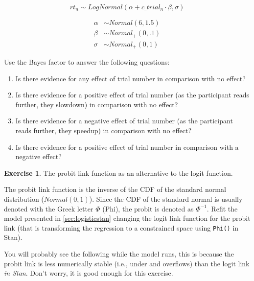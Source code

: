 \documentclass[12pt,]{krantz}
\providecommand{\tightlist}{%
  \setlength{\itemsep}{0pt}\setlength{\parskip}{0pt}}
\theoremstyle{definition}
\theoremstyle{definition}
\theoremstyle{definition}
\newtheorem{exercise}{Exercise}[chapter]
\theoremstyle{remark}
\begin{document}
\begin{equation}
rt_n \sim LogNormal(\alpha + c\_trial_n \cdot \beta,\sigma)
\end{equation}

\begin{equation}
\begin{aligned}
\alpha &\sim Normal(6, 1.5) \\
\beta &\sim Normal_+(0, .1)\\
\sigma &\sim Normal_+(0, 1)
\end{aligned}
\end{equation}

Use the Bayes factor to answer the following questions:

\begin{enumerate}
\def\labelenumi{\alph{enumi}.}
\tightlist
\item
  Is there evidence for any effect of trial number in comparison with no
  effect?
\item
  Is there evidence for a positive effect of trial number (as the
  participant reads further, they slowdown) in comparison with no
  effect?
\item
  Is there evidence for a negative effect of trial number (as the
  participant reads further, they speedup) in comparison with no effect?
\item
  Is there evidence for a positive effect of trial number in comparison
  with a negative effect?
\end{enumerate}

\begin{exercise}
\protect\hypertarget{exr:linkfunction}{}{\label{exr:linkfunction} }The
probit link function as an alternative to the logit function.
\end{exercise}

The probit link function is the inverse of the CDF of the standard
normal distribution (\(Normal(0,1)\)). Since the CDF of the standard
normal is usually denoted with the Greek letter \(\Phi\) (Phi), the
probit is denoted as \(\Phi^{-1}\). Refit the model presented in
\ref{sec:logisticstan} changing the logit link function for the probit
link (that is transforming the regression to a constrained space using
\texttt{Phi()} in Stan).

You will probably see the following while the model runs, this is
because the probit link is less numerically stable (i.e., under and
overflows) than the logit link \emph{in Stan}. Don't worry, it is good
enough for this exercise.
\end{document}
